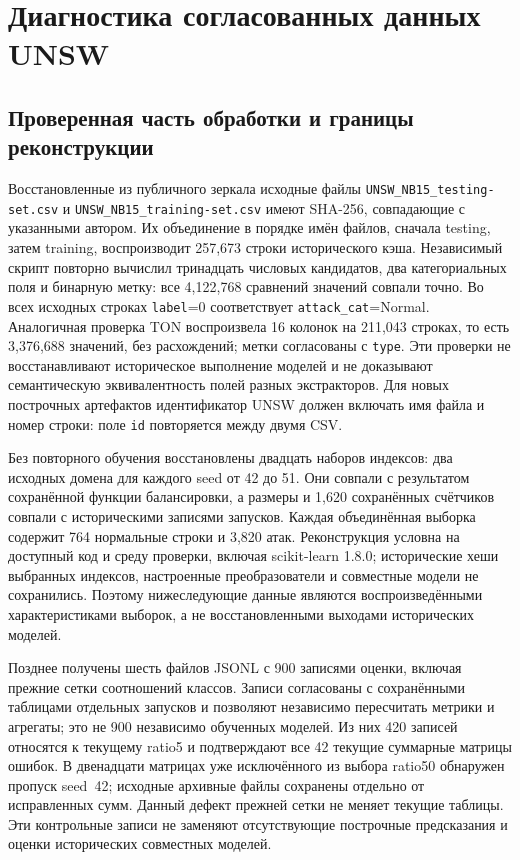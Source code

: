 \section{Диагностика согласованных данных UNSW}
\label{app:unsw-diagnostics}
\subsection{Проверенная часть обработки и границы реконструкции}
Восстановленные из публичного зеркала исходные файлы \texttt{UNSW\_NB15\_testing-set.csv} и \texttt{UNSW\_NB15\_training-set.csv} имеют SHA-256, совпадающие с указанными автором. Их объединение в порядке имён файлов, сначала testing, затем training, воспроизводит 257,673 строки исторического кэша. Независимый скрипт повторно вычислил тринадцать числовых кандидатов, два категориальных поля и бинарную метку: все 4,122,768 сравнений значений совпали точно. Во всех исходных строках \texttt{label}=0 соответствует \texttt{attack\_cat}=Normal. Аналогичная проверка TON воспроизвела 16 колонок на 211,043 строках, то есть 3,376,688 значений, без расхождений; метки согласованы с \texttt{type}. Эти проверки не восстанавливают историческое выполнение моделей и не доказывают семантическую эквивалентность полей разных экстракторов. Для новых построчных артефактов идентификатор UNSW должен включать имя файла и номер строки: поле \texttt{id} повторяется между двумя CSV.

Без повторного обучения восстановлены двадцать наборов индексов: два исходных домена для каждого seed от 42 до 51. Они совпали с результатом сохранённой функции балансировки, а размеры и 1,620 сохранённых счётчиков совпали с историческими записями запусков. Каждая объединённая выборка содержит 764 нормальные строки и 3,820 атак. Реконструкция условна на доступный код и среду проверки, включая scikit-learn 1.8.0; исторические хеши выбранных индексов, настроенные преобразователи и совместные модели не сохранились. Поэтому нижеследующие данные являются воспроизведёнными характеристиками выборок, а не восстановленными выходами исторических моделей.

Позднее получены шесть файлов JSONL с 900 записями оценки, включая прежние сетки соотношений классов. Записи согласованы с сохранёнными таблицами отдельных запусков и позволяют независимо пересчитать метрики и агрегаты; это не 900 независимо обученных моделей. Из них 420 записей относятся к текущему ratio5 и подтверждают все 42 текущие суммарные матрицы ошибок. В двенадцати матрицах уже исключённого из выбора ratio50 обнаружен пропуск seed~42; исходные архивные файлы сохранены отдельно от исправленных сумм. Данный дефект прежней сетки не меняет текущие таблицы. Эти контрольные записи не заменяют отсутствующие построчные предсказания и оценки исторических совместных моделей.

